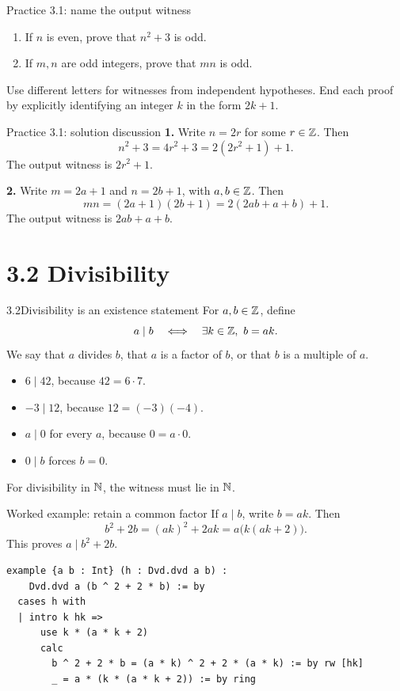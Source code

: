\begin{frame}{Practice 3.1: name the output witness}
\begin{enumerate}
\item If $n$ is even, prove that $n^2+3$ is odd.
\item If $m,n$ are odd integers, prove that $mn$ is odd.
\end{enumerate}
\vspace{1em}
Use different letters for witnesses from independent hypotheses.
End each proof by explicitly identifying an integer $k$ in the form $2k+1$.
\end{frame}

\begin{frame}{Practice 3.1: solution discussion}
\textbf{1.} Write $n=2r$ for some $r\in\mathbb{Z}$. Then
\[
n^2+3=4r^2+3=2(2r^2+1)+1.
\]
The output witness is $2r^2+1$.
\medskip

\textbf{2.} Write $m=2a+1$ and $n=2b+1$, with $a,b\in\mathbb{Z}$. Then
\[
mn=(2a+1)(2b+1)=2(2ab+a+b)+1.
\]
The output witness is $2ab+a+b$.
\end{frame}

\section{3.2 Divisibility}
\begin{frame}{3.2\quad Divisibility is an existence statement}
For $a,b\in\mathbb{Z}$, define
\[
a\mid b\quad\Longleftrightarrow\quad\exists k\in\mathbb{Z},\ b=ak.
\]
We say that $a$ divides $b$, that $a$ is a factor of $b$, or that $b$ is a multiple of $a$.
\begin{itemize}
\item $6\mid42$, because $42=6\cdot7$.
\item $-3\mid12$, because $12=(-3)(-4)$.
\item $a\mid0$ for every $a$, because $0=a\cdot0$.
\item $0\mid b$ forces $b=0$.
\end{itemize}
For divisibility in $\mathbb{N}$, the witness must lie in $\mathbb{N}$.
\end{frame}

\begin{frame}[fragile]{Worked example: retain a common factor}
If $a\mid b$, write $b=ak$. Then
\[
b^2+2b=(ak)^2+2ak=a\bigl(k(ak+2)\bigr).
\]
This proves $a\mid b^2+2b$.
\begin{lstlisting}
example {a b : Int} (h : Dvd.dvd a b) :
    Dvd.dvd a (b ^ 2 + 2 * b) := by
  cases h with
  | intro k hk =>
      use k * (a * k + 2)
      calc
        b ^ 2 + 2 * b = (a * k) ^ 2 + 2 * (a * k) := by rw [hk]
        _ = a * (k * (a * k + 2)) := by ring
\end{lstlisting}
\end{frame}

